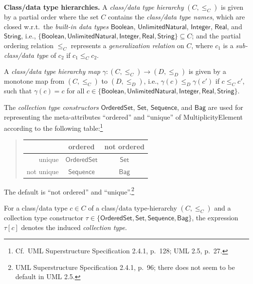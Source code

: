 \documentclass[10pt,fleqn,final]{scrreprt}
\newenvironment{definitions}[0]{\medskip }{}
\newcommand{\uml}[1]{\textsf{#1}}
\begin{document}
\begin{definitions}
\medskip\noindent\textbf{Class/data type hierarchies.}  A
\emph{class/data type hierarchy} $(C, {\leq_C})$ is given by a partial
order where the set $C$ contains the \emph{class/data type names}, which
are closed w.r.t.\ the \emph{built-in data types} $\mathsf{Boolean}$,
$\mathsf{UnlimitedNatural}$, $\mathsf{Integer}$, $\mathsf{Real}$, and
$\mathsf{String}$, i.e.,
$\{ \mathsf{Boolean}, \mathsf{UnlimitedNatural},\allowbreak
\mathsf{Integer}, \mathsf{Real}, \mathsf{String} \} \subseteq
C$;
and the partial ordering relation $\leq_C$ represents a
\emph{generalization relation} on $C$, where $c_1$ is a
\emph{sub-class/data type} of $c_2$ if $c_1 \leq_C c_2$.

A \emph{class/data type hierarchy map}
$\gamma : (C, {\leq_C}) \to (D, {\leq_D})$ is given by a monotone map
from $(C, {\leq_C})$ to $(D, {\leq_D})$, i.e.,
$\gamma(c) \leq_D \gamma(c')$ if $c \leq_C c'$, such that
$\gamma(c) = c$ for all
$c \in \{ \mathsf{Boolean},\allowbreak \mathsf{UnlimitedNatural},\allowbreak
\mathsf{Integer}, \mathsf{Real}, \mathsf{String} \}$.

\medskip
 The \emph{collection type constructors} $\mathsf{OrderedSet}$,
$\mathsf{Set}$, $\mathsf{Sequence}$, and $\mathsf{Bag}$ are used for
representing the meta-attributes ``ordered'' and ``unique'' of
\uml{MultiplicityElement} according to the following
table:\footnote{Cf.~UML Superstructure Specification 2.4.1, p.~128; UML
  2.5, p.~27.}
%
\begin{quotation}
\begin{tabular}{@{}r||c|c@{}}
             & ordered               & not ordered\\
\hline\hline
  unique     & $\mathsf{OrderedSet}$ & $\mathsf{Set}$\\
\hline
  not unique & $\mathsf{Sequence}$   & $\mathsf{Bag}$
\end{tabular}
\end{quotation}
%
The default is ``not ordered'' and ``unique''.\footnote{UML
  Superstructure Specification 2.4.1, p.~96; there does not seem to be
  default in UML 2.5.}

For a class/data type $c \in C$ of a class/data type-hierarchy
$(C, {\leq_C})$ and a collection type constructor
$\tau \in \{ \mathsf{OrderedSet}, \mathsf{Set}, \mathsf{Sequence},
\mathsf{Bag} \}$,
 the expression $\tau[c]$ denotes the induced \emph{collection type}.


\end{definitions}
\end{document}
